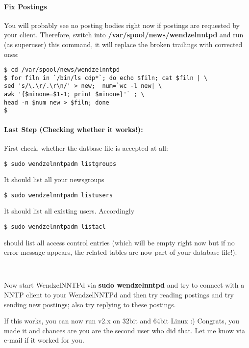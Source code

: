 \paragraph*{Fix Postings}

You will probably see no posting bodies right now if postings are requested by your client. Therefore, switch into {\bf /var/spool/news/wendzelnntpd} and run (as superuser) this command, it will replace the broken trailings with corrected ones:

\begin{verbatim}
$ cd /var/spool/news/wendzelnntpd 
$ for filn in `/bin/ls cdp*`; do echo $filn; cat $filn | \
sed 's/\.\r/.\r\n/' > new;  num=`wc -l new| \
awk '{$minone=$1-1; print $minone}'` ; \
head -n $num new > $filn; done
$
\end{verbatim}

\paragraph*{Last Step (Checking whether it works!):}

First check, whether the datbase file is accepted at all:

\begin{verbatim}
$ sudo wendzelnntpadm listgroups
\end{verbatim}

It should list all your newsgroups

\begin{verbatim}
$ sudo wendzelnntpadm listusers
\end{verbatim}

It should list all existing users. Accordingly

\begin{verbatim}
$ sudo wendzelnntpadm listacl
\end{verbatim}

should list all access control entries (which will be empty right now but if no error message appears, the related tables are now part of your database file!).

~

Now start WendzelNNTPd via {\bf sudo wendzelnntpd} and try to connect with a NNTP client to your WendzelNNTPd and then try reading postings and try sending new postings; also try replying to these postings.

If this works, you can now run v2.x on 32bit and 64bit Linux :) Congrats, you made it and chances are you are the second user who did that. Let me know via e-mail if it worked for you.

